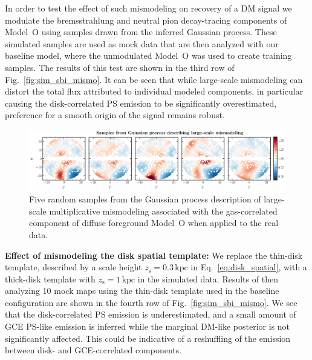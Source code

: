\documentclass[prd,aps,10pt,nofootinbib,twocolumn,superscriptaddress,preprintnumbers,balancelastpage,longbibliography,floatfix]{revtex4-2}
\begin{document}
In order to test the effect of such mismodeling on recovery of a DM signal we modulate the bremsstrahlung and neutral pion decay-tracing components of {Model~O} using samples drawn from the inferred Gaussian process. These simulated samples are used as mock data that are then analyzed with our baseline model, where the unmodulated {Model~O} was used to create training samples.
The results of this test are shown in the third row of Fig.~\ref{fig:sim_sbi_mismo}. It can be seen that while large-scale mismodeling can distort the total flux attributed to individual modeled components, in particular causing the disk-correlated PS emission to be significantly overestimated, preference for a smooth origin of the signal remains robust. \\

%
\begin{figure}[t]
\centering
\includegraphics[width=1.\textwidth]{plots/dd_mismo_map.pdf}
\caption{Five random samples from the Gaussian process description of large-scale multiplicative mismodeling associated with the gas-correlated component of diffuse foreground {Model~O} when applied to the real \Fermi data.}
\label{fig:dd_mismo_map}
\end{figure}
%

\noindent
\textbf{Effect of mismodeling the disk spatial template:} 
We replace the thin-disk template, described by a scale height $z_\mathrm{s} = 0.3\,\mathrm{kpc}$ in Eq.~\eqref{eq:disk_spatial}, with a thick-disk template with $z_\mathrm{s} = 1\,\mathrm{kpc}$ in the simulated data. Results of then analyzing 10 mock maps using the thin-disk template used in the baseline configuration are shown in the fourth row of Fig.~\ref{fig:sim_sbi_mismo}. We see that the disk-correlated PS emission is underestimated, and a small amount of GCE PS-like emission is inferred while the marginal DM-like posterior is not significantly affected. This could be indicative of a reshuffling of the emission between disk- and GCE-correlated components. \\
\end{document}
